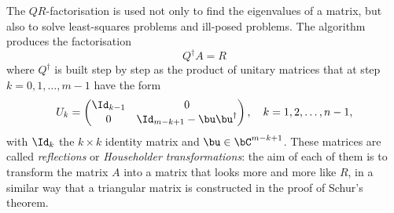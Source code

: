 The $QR$-factorisation is used not only to find the eigenvalues of a
matrix, but also to solve least-squares problems and ill-posed
problems.  The algorithm produces the factorisation
%
\begin{equation}
  Q^{\dagger} A = R
  \label{eq:Ev16}
\end{equation}
%
where $Q^{\dagger}$ is built step by step as the product of unitary
matrices that at step $k=0,1,\ldots,m-1$ have the form
%
\begin{equation}
  U_k =
  \begin{pmatrix}
    \Id_{k-1} & 0 \\ 0 & \Id_{m-k+1} - \bu \bu^{\dagger}
  \end{pmatrix},
  \quad k = 1,2, \ldots, n-1,
  \label{eq:Ev17}
\end{equation}
% 
with $\Id_k$ the $k \times k$ identity matrix and $\bu \in
\bC^{m-k+1}$.  These matrices are called \textit{reflections} or
\textit{Householder transformations}: the aim of each of them is to
transform the matrix $A$ into a matrix that looks more and more like
$R$, in a similar way that a triangular matrix is constructed in the
proof of Schur's theorem.

